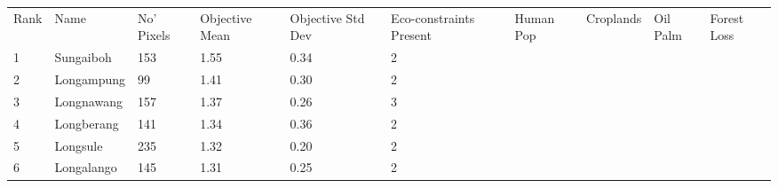 \begin{table}[ht]
\centering
\begingroup\fontsize{9pt}{10pt}\selectfont
\begin{tabular}{C{0.05\textwidth}C{0.15\textwidth}C{0.08\textwidth}C{0.08\textwidth}C{0.08\textwidth}C{0.08\textwidth}C{0.08\textwidth}C{0.08\textwidth}C{0.08\textwidth}C{0.08\textwidth}}
 Rank & Name & No' Pixels & Objective Mean & Objective Std Dev & Eco-constraints  Present & Human Pop & Croplands & Oil Palm & Forest Loss \\ 
 {1} & Sungaiboh & 153 & \textcolor[HTML]{FFFFFF}{1.55} & \textcolor[HTML]{FFFFFF}{0.34} & \textcolor[HTML]{000000}{2} &  &  &  &  \\ 
  {2} & Longampung &  99 & \textcolor[HTML]{FFFFFF}{1.41} & \textcolor[HTML]{000000}{0.30} & \textcolor[HTML]{000000}{2} &  &  &  &  \\ 
  {3} & Longnawang & 157 & \textcolor[HTML]{FFFFFF}{1.37} & \textcolor[HTML]{000000}{0.26} & \textcolor[HTML]{FFFFFF}{3} &  &  &  &  \\ 
  {4} & Longberang & 141 & \textcolor[HTML]{FFFFFF}{1.34} & \textcolor[HTML]{FFFFFF}{0.36} & \textcolor[HTML]{000000}{2} &  &  &  &  \\ 
  {5} & Longsule & 235 & \textcolor[HTML]{FFFFFF}{1.32} & \textcolor[HTML]{000000}{0.20} & \textcolor[HTML]{000000}{2} &  &  &  &  \\ 
  {6} & Longalango & 145 & \textcolor[HTML]{FFFFFF}{1.31} & \textcolor[HTML]{000000}{0.25} & \textcolor[HTML]{000000}{2} &  &  &  &  \\ 

\end{tabular}
\end{table}

